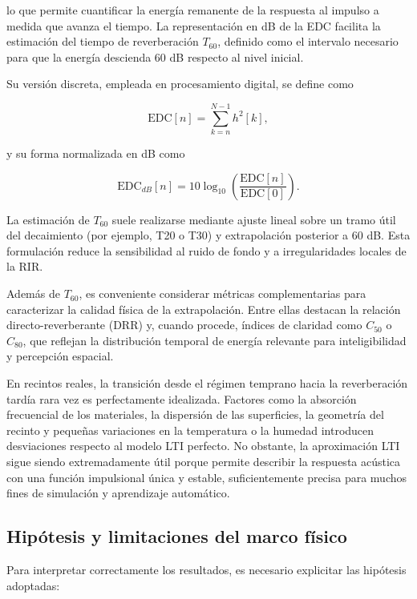 lo que permite cuantificar la energía remanente de la respuesta al impulso a medida que avanza el tiempo. La representación en dB de la EDC facilita la estimación del tiempo de reverberación $T_{60}$, definido como el intervalo necesario para que la energía descienda 60 dB respecto al nivel inicial.

Su versión discreta, empleada en procesamiento digital, se define como

\begin{equation}
\mathrm{EDC}[n] = \sum_{k=n}^{N-1} h^2[k],
\end{equation}

y su forma normalizada en dB como

\begin{equation}
\mathrm{EDC}_{dB}[n] = 10\log_{10}\left(\frac{\mathrm{EDC}[n]}{\mathrm{EDC}[0]}\right).
\end{equation}

La estimación de $T_{60}$ suele realizarse mediante ajuste lineal sobre un tramo útil del decaimiento (por ejemplo, T20 o T30) y extrapolación posterior a 60 dB. Esta formulación reduce la sensibilidad al ruido de fondo y a irregularidades locales de la RIR.

Además de $T_{60}$, es conveniente considerar métricas complementarias para caracterizar la calidad física de la extrapolación. Entre ellas destacan la relación directo-reverberante (DRR) y, cuando procede, índices de claridad como $C_{50}$ o $C_{80}$, que reflejan la distribución temporal de energía relevante para inteligibilidad y percepción espacial.

En recintos reales, la transición desde el régimen temprano hacia la reverberación tardía rara vez es perfectamente idealizada. Factores como la absorción frecuencial de los materiales, la dispersión de las superficies, la geometría del recinto y pequeñas variaciones en la temperatura o la humedad introducen desviaciones respecto al modelo LTI perfecto.  No obstante, la aproximación LTI sigue siendo extremadamente útil porque permite describir la respuesta acústica con una función impulsional única y estable, suficientemente precisa para muchos fines de simulación y aprendizaje automático.\cite{Kuttruff2016}

\subsection{Hipótesis y limitaciones del marco físico}

Para interpretar correctamente los resultados, es necesario explicitar las hipótesis adoptadas:

